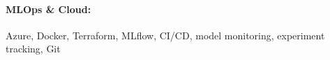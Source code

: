 \documentclass[10pt, letterpaper]{article}
\newenvironment{highlights}{
    \begin{itemize}[
        topsep=0.10 cm,
        parsep=0.10 cm,
        partopsep=0pt,
        itemsep=0pt,
        leftmargin=0 cm + 10pt
    ]
}{
    \end{itemize}
} %
\newenvironment{onecolentry}{
    \begin{adjustwidth}{
        0 cm + 0.00001 cm
    }{
        0 cm + 0.00001 cm
    }
}{
    \end{adjustwidth}
} %
\begin{document}
        \paragraph{MLOps \& Cloud:} Azure, Docker, Terraform, MLflow, CI/CD, model monitoring, experiment tracking, Git

    
        



    
    
    


    
\end{document}
